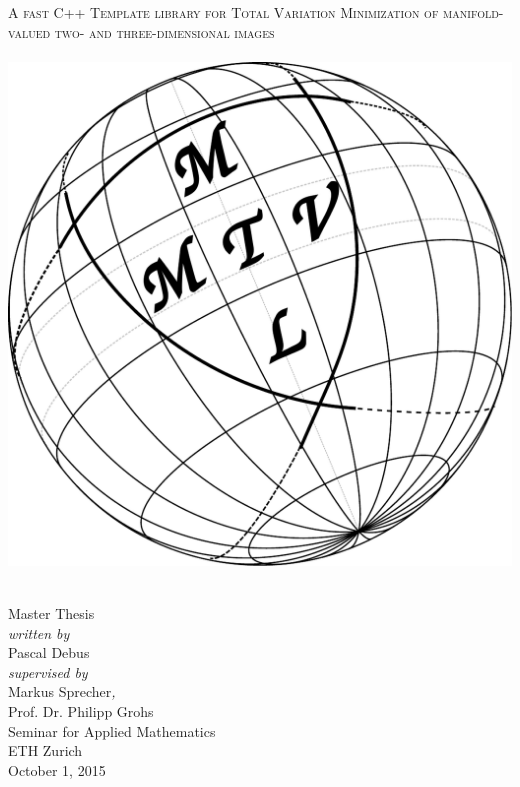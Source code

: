 \begin{titlepage}
\begin{center}
  \hfill
  \vspace{2.5cm}

  { \huge\textsc{\LARGE A fast C++ Template library for Total Variation Minimization of manifold-valued 
  two- and three-dimensional images\\[10pt]
  }}
  	~\\[20pt]
	
   \includegraphics[width=0.5\linewidth]{./figures/mtvmtl.pdf}
	
	~\\[20pt]

  {\huge{Master Thesis}}\\[2.5cm]

  {\emph{written by}}\\
  {\large Pascal Debus}
  \\[0.6cm]
  {\emph{supervised by}}\\
  Markus Sprecher{\emph{,}}\\
  Prof. Dr. Philipp Grohs\\

  Seminar for Applied Mathematics\\
  ETH Zurich
  \\[0.5cm]
  {October 1, 2015}
\end{center}
\end{titlepage}

